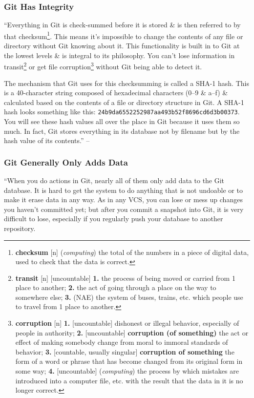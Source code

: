 \documentclass[oneside]{book}
\numberwithin{equation}{section}
\begin{document}
\subsubsection{Git Has Integrity}
``Everything in Git is check-summed before it is stored \& is then referred to by that checksum\footnote{\textbf{checksum} [n] (\textit{computing}) the total of the numbers in a piece of digital data, used to check that the data is correct.}. This means it's impossible to change the contents of any file or directory without Git knowing about it. This functionality is built in to Git at the lowest levels \& is integral to its philosophy. You can't lose information in transit\footnote{\textbf{transit} [n] [uncountable] \textbf{1.} the process of being moved or carried from 1 place to another; \textbf{2.} the act of going through a place on the way to somewhere else; \textbf{3.} (NAE) the system of buses, trains, etc. which people use to travel from 1 place to another.} or get file corruption\footnote{\textbf{corruption} [n] \textbf{1.} [uncountable] dishonest or illegal behavior, especially of people in authority; \textbf{2.} [uncountable] \textbf{corruption (of something)} the act or effect of making somebody change from moral to immoral standards of behavior; \textbf{3.} [countable, usually singular] \textbf{corruption of something} the form of a word or phrase that has become changed from its original form in some way; \textbf{4.} [uncountable] (\textit{computing}) the process by which mistakes are introduced into a computer file, etc. with the result that the data in it is no longer correct.} without Git being able to detect it.

The mechanism that Git uses for this checksumming is called a SHA-1 hash. This is a 40-character string composed of hexadecimal characters (0--9 \& a--f) \& calculated based on the contents of a file or directory structure in Git. A SHA-1 hash looks something like this: \texttt{24b9da6552252987aa493b52f8696cd6d3b00373}. You will see these hash values all over the place in Git because it uses them so much. In fact, Git stores everything in its database not by filename but by the hash value of its contents.'' -- \cite[p. 7]{Chacon_Straub2014}

\subsubsection{Git Generally Only Adds Data}
``When you do actions in Git, nearly all of them only add data to the Git database. It is hard to get the system to do anything that is not undoable or to make it erase data in any way. As in any VCS, you can lose or mess up changes you haven't committed yet; but after you commit a snapshot into Git, it is very difficult to lose, especially if you regularly push your database to another repository.
\end{document}

